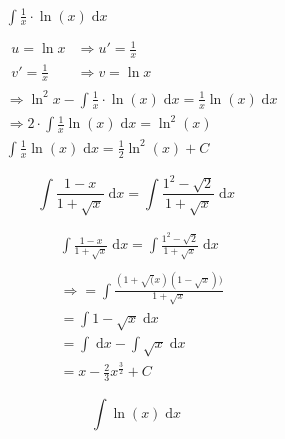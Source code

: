\begin{uebung}
	\begin{solution}
		\begin{align*}
			 & \int \frac{1}{x} \cdot \ln(x) \;\mathrm{d}x                                                          \\
			\\
			 & \begin{array}{ll}
				u = \ln x        & \Rightarrow u'= \frac{1}{x} \\
				v' = \frac{1}{x} & \Rightarrow v = \ln x
			\end{array}                                                                            \\
			 & \Rightarrow{} \ln^2 x- \int\frac{1}{x} \cdot \ln(x) \;\mathrm{d}x = \frac{1}{x} \ln(x) \;\mathrm{d}x \\
			 & \Rightarrow{} 2 \cdot \int\frac{1}{x} \ln(x) \;\mathrm{d}x = \ln^2(x)                                \\
			 & \int\frac{1}{x} \ln(x) \;\mathrm{d}x = \frac{1}{2} \ln^2 (x) + C
		\end{align*}
	\end{solution}

	\begin{question}
		\[
			\int \frac{1-x}{1+\sqrt{x}} \;\mathrm{d}x = \int \frac{1^2 - \sqrt{2}}{1+ \sqrt{x}} \;\mathrm{d}x
		\]
	\end{question}

	\begin{solution}
		\begin{align*}
			 & \int \frac{1-x}{1+\sqrt{x}} \;\mathrm{d}x = \int \frac{1^2 - \sqrt{2}}{1+ \sqrt{x}} \;\mathrm{d}x \\
			\\
			 & \Rightarrow = \int \frac{(1 + \sqrt(x) (1 - \sqrt{x}))}{1 + \sqrt{x}}                             \\
			 & = \int 1 - \sqrt{x} \;\mathrm{d}x                                                                 \\
			 & = \int \;\mathrm{d}x - \int \sqrt{x} \;\mathrm{d}x                                                \\
			 & = x - \frac{2}{3} x^{\frac{3}{2}} + C
		\end{align*}
	\end{solution}

	\begin{question}
		\[
			\int \ln(x) \;\mathrm{d}x
		\]
	\end{question}


\end{uebung}
